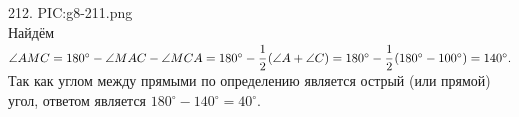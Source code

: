212. {{PIC:g8-211.png}}\\
Найдём $\angle AMC=180^\circ-\angle MAC-\angle MCA=180^\circ-\cfrac{1}{2}\left(\angle A +\angle C\right)=180^\circ-\cfrac{1}{2}\left(180^\circ-100^\circ\right)=140^\circ.$ Так как углом между прямыми по определению является острый (или прямой) угол, ответом является $180^\circ-140^\circ=40^\circ.$\\
